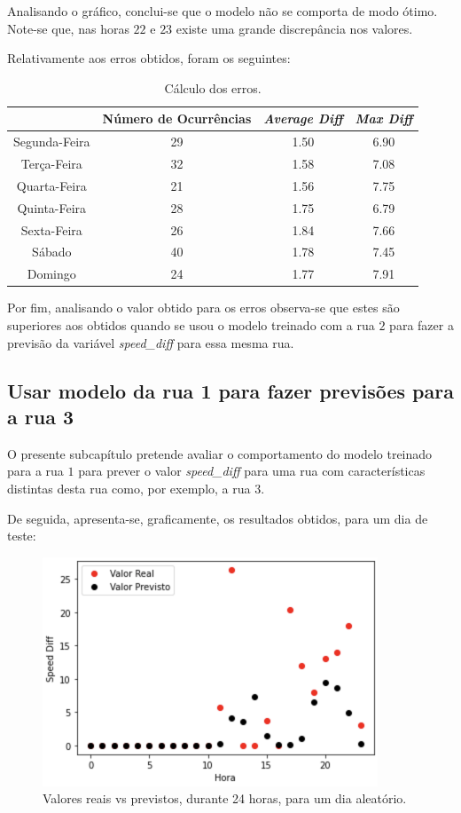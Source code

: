 \documentclass[a4paper, 12pt]{article}
\begin{document}
Analisando o gráfico, conclui-se que o modelo não se comporta de modo ótimo. Note-se que, nas horas $22$ e $23$ existe uma grande discrepância nos valores.

Relativamente aos erros obtidos, foram os seguintes:

\begin{table}[H]
	\centering
	\begin{tabular}{||c||c|c|c||}
		\hline\hline
		&Número de Ocurrências& \textit{Average Diff} & \textit{Max Diff} \\
		\hline\hline
		Segunda-Feira & 29&1.50
		& 6.90 \\
		\hline
		Terça-Feira  &32&
		1.58
		& 7.08 \\
		\hline
		Quarta-Feira & 21&
		1.56 & 7.75	\\
		\hline
		Quinta-Feira  & 28&1.75
		& 6.79	\\
		\hline
		Sexta-Feira & 26&
		1.84 & 7.66 \\
		\hline
		Sábado &40 & 1.78
		& 7.45 \\
		\hline
		Domingo & 24&
		1.77 & 
		7.91
		\\
		\hline\hline
	\end{tabular}
	\label{table:mod2_rua1}
	\caption{Cálculo dos erros.}
\end{table}

Por fim, analisando o valor obtido para os erros observa-se que estes são superiores aos obtidos quando se usou o modelo treinado com a rua $2$ para fazer a previsão da variável \textit{speed\_diff} para essa mesma rua.

\subsection{Usar modelo da rua 1 para fazer previsões para a rua 3}

O presente subcapítulo pretende avaliar o comportamento do modelo treinado para a rua $1$ para prever o valor \textit{speed\_diff} para uma rua com características distintas desta rua como, por exemplo, a rua $3$.

De seguida, apresenta-se, graficamente, os resultados obtidos, para um dia de teste:

\begin{figure}[H]
	\centering
	\includegraphics[width=10cm]{resultados/real_prev_mod1_rua3.png}
	\caption{Valores reais vs previstos, durante 24 horas, para um dia aleatório.}
\end{figure}
\end{document}
